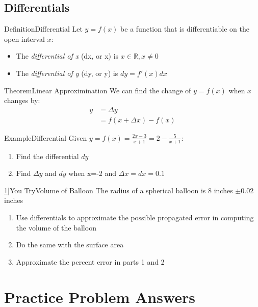 \documentclass{MathNotes}
\newenvironment{example}[1]{\begin{BlueBox}{Example}{#1}}{\end{BlueBox}}
\newenvironment{definition}[1]{\begin{RedBox}{Definition}{#1}}{\end{RedBox}}
\newenvironment{theorem}[1]{\begin{GrayBox}{Theorem}{#1}}{\end{GrayBox}}
\newenvironment{practice}[2]{\begin{PurpleBox}{\texorpdfstring{#1}\Big|You Try}{#2}}{\end{PurpleBox}}
\begin{document}
\subsection{Differentials}
\begin{definition}{Differential}
Let $y=f(x)$ be a function that is differentiable on the open interval $x$:
\begin{itemize}
\item The \textit{differential of x} (dx, or \Delta x) is $x\in\mathbb{R}, x\neq 0$
\item The \textit{differential of y} (dy, or \Delta y) is $dy=f'(x)dx$
\end{itemize}
\end{definition}
\begin{theorem}{Linear Approximination}
We can find the change of $y=f(x)$ when $x$ changes by:
\begin{align*}
y&=\Delta y\\
&=f(x+\Delta x)-f(x)
\end{align*}
\end{theorem}
\begin{example}{Differential}
Given $\displaystyle y=f(x)=\frac{2x-3}{x+1}=2-\frac{5}{x+1}$:
\begin{enumerate}
\item Find the differential $dy$
\item Find $\Delta y$ and $dy$ when x=-2 and $\Delta x=dx=0.1$
\end{enumerate}

\end{example}
\begin{practice}{\hyperref[ans:3.6-1]{1}}{Volume of Balloon}
The radius of a spherical balloon is 8 inches $\pm 0.02$ inches
\begin{enumerate}
\item Use differentials to approximate the possible propagated error in computing the volume of the balloon
\item Do the same with the surface area
\item Approximate the percent error in parts 1 and 2 
\end{enumerate}
\end{practice}


\newpage
\section{Practice Problem Answers}
\end{document}
